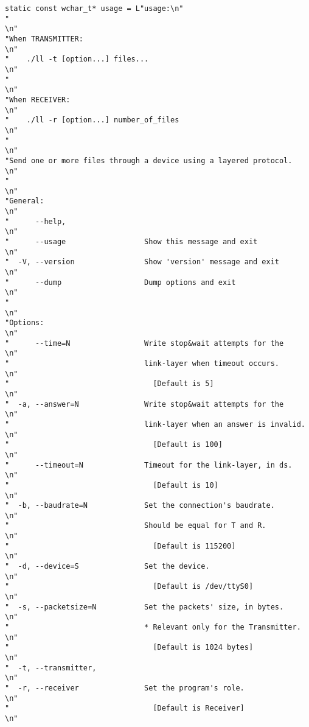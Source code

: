 \documentclass[subfiles]{main.tex}
\begin{document}
\begin{lstlisting}[style=rcom]
static const wchar_t* usage = L"usage:\n"
"                                                                     \n"
"When TRANSMITTER:                                                    \n"
"    ./ll -t [option...] files...                                     \n"
"                                                                     \n"
"When RECEIVER:                                                       \n"
"    ./ll -r [option...] number_of_files                              \n"
"                                                                     \n"
"Send one or more files through a device using a layered protocol.    \n"
"                                                                     \n"
"General:                                                             \n"
"      --help,                                                        \n"
"      --usage                  Show this message and exit            \n"
"  -V, --version                Show 'version' message and exit       \n"
"      --dump                   Dump options and exit                 \n"
"                                                                     \n"
"Options:                                                             \n"
"      --time=N                 Write stop&wait attempts for the      \n"
"                               link-layer when timeout occurs.       \n"
"                                 [Default is 5]                      \n"
"  -a, --answer=N               Write stop&wait attempts for the      \n"
"                               link-layer when an answer is invalid. \n"
"                                 [Default is 100]                    \n"
"      --timeout=N              Timeout for the link-layer, in ds.    \n"
"                                 [Default is 10]                     \n"
"  -b, --baudrate=N             Set the connection's baudrate.        \n"
"                               Should be equal for T and R.          \n"
"                                 [Default is 115200]                 \n"
"  -d, --device=S               Set the device.                       \n"
"                                 [Default is /dev/ttyS0]             \n"
"  -s, --packetsize=N           Set the packets' size, in bytes.      \n"
"                               * Relevant only for the Transmitter.  \n"
"                                 [Default is 1024 bytes]             \n"
"  -t, --transmitter,                                                 \n"
"  -r, --receiver               Set the program's role.               \n"
"                                 [Default is Receiver]               \n"

\end{lstlisting}
\end{document}

